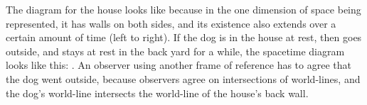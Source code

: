 The diagram for the house looks like 
because in the one dimension of space being represented, it has walls on both sides, and
its existence also extends over a certain amount of time (left to right). If the dog is
in the house at rest, then goes outside, and stays at rest in the back yard for a while,
the spacetime diagram looks like this: 
.
An observer using another frame of reference has to agree that the dog went outside, because
observers agree on intersections of world-lines, and the dog's world-line intersects the
world-line of the house's back wall.

